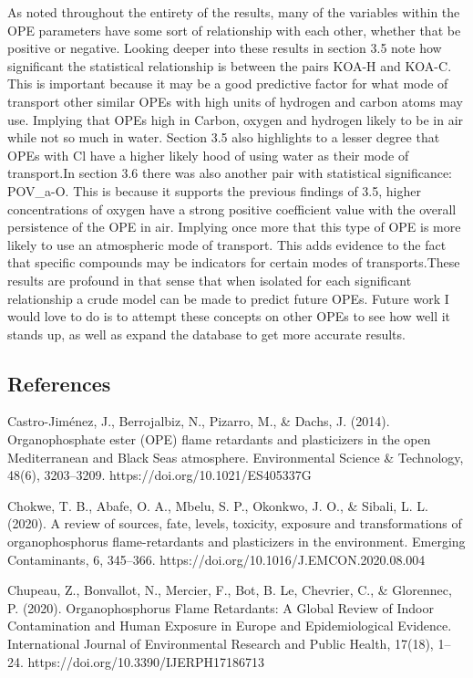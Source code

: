 \documentclass[journal=jacsat,manuscript=article]{achemso}
\begin{document}
As noted throughout the entirety of the results, many of the variables
within the OPE parameters have some sort of relationship with each
other, whether that be positive or negative. Looking deeper into these
results in section 3.5 note how significant the statistical relationship
is between the pairs KOA-H and KOA-C. This is important because it may
be a good predictive factor for what mode of transport other similar
OPEs with high units of hydrogen and carbon atoms may use. Implying that
OPEs high in Carbon, oxygen and hydrogen likely to be in air while not
so much in water. Section 3.5 also highlights to a lesser degree that
OPEs with Cl have a higher likely hood of using water as their mode of
transport.In section 3.6 there was also another pair with statistical
significance: POV\_a-O. This is because it supports the previous
findings of 3.5, higher concentrations of oxygen have a strong positive
coefficient value with the overall persistence of the OPE in air.
Implying once more that this type of OPE is more likely to use an
atmospheric mode of transport. This adds evidence to the fact that
specific compounds may be indicators for certain modes of
transports.These results are profound in that sense that when isolated
for each significant relationship a crude model can be made to predict
future OPEs. Future work I would love to do is to attempt these concepts
on other OPEs to see how well it stands up, as well as expand the
database to get more accurate results.

\hypertarget{references}{%
\subsection{References}\label{references}}

Castro-Jiménez, J., Berrojalbiz, N., Pizarro, M., \& Dachs, J. (2014).
Organophosphate ester (OPE) flame retardants and plasticizers in the
open Mediterranean and Black Seas atmosphere. Environmental Science \&
Technology, 48(6), 3203--3209. https://doi.org/10.1021/ES405337G

Chokwe, T. B., Abafe, O. A., Mbelu, S. P., Okonkwo, J. O., \& Sibali, L.
L. (2020). A review of sources, fate, levels, toxicity, exposure and
transformations of organophosphorus flame-retardants and plasticizers in
the environment. Emerging Contaminants, 6, 345--366.
https://doi.org/10.1016/J.EMCON.2020.08.004

Chupeau, Z., Bonvallot, N., Mercier, F., Bot, B. Le, Chevrier, C., \&
Glorennec, P. (2020). Organophosphorus Flame Retardants: A Global Review
of Indoor Contamination and Human Exposure in Europe and Epidemiological
Evidence. International Journal of Environmental Research and Public
Health, 17(18), 1--24. https://doi.org/10.3390/IJERPH17186713
\end{document}
